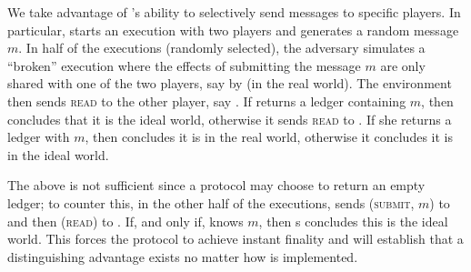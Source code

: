   \begin{proofsketch}
    We take advantage of \adversary's ability to selectively send messages
    to specific players. In particular, \environment{} starts an execution with
    two players and generates a random message $m$. In half of the executions
    (randomly selected),  the adversary simulates a ``broken''  \perfectprot{} execution where the effects of submitting the message 
    $m$ are only shared with one of the two players, say
    \alice{} by \adversary{} (in the real world). The environment then sends
    \textsc{read} to the other player, say \bob. If \bob{} returns a ledger containing
    $m$, then
    \environment{} concludes that it is the ideal world, otherwise it sends
    \textsc{read} to \alice. If she returns a ledger with $m$, then \environment{} concludes it is in the real world, otherwise it concludes it is in the ideal world.

    The above is not sufficient since a protocol may choose to  return an
    empty ledger; to counter this, 
    in the other half of the executions, \environment{} sends
    (\textsc{submit}, $m$) to \alice{} and then (\textsc{read}) to \bob. If, and only if, 
    \bob{} knows $m$, then \environment{}s concludes this is the ideal world.   
    This  forces the \perfectprot{}  protocol to achieve instant finality and will establish that a distinguishing advantage exists no matter how \perfectprot{} is implemented. 
  \end{proofsketch}
